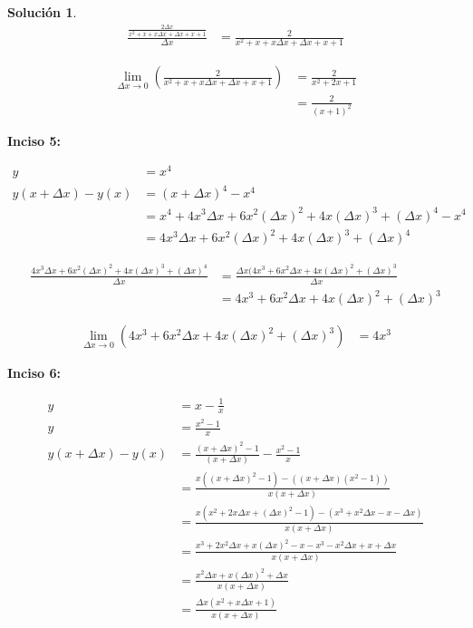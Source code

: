 \documentclass{article}
\theoremstyle{definition}
\newtheorem*{solution}{Solución}
\begin{document}
\begin{solution}
    \begin{align*}
        \frac{\frac{2\Delta x}{x^2+x+x\Delta x+\Delta x+x+1}}{\Delta x} &= \frac{2}{x^2+x+x\Delta x+\Delta x+x+1}
    \end{align*}

    \begin{align*}
        \lim_{\Delta x \to 0} (\frac{2}{x^2+x+x\Delta x+\Delta x+x+1}) &= \frac{2}{x^2+2x+1} \\
        &= \frac{2}{(x+1)^2}
    \end{align*}

\textbf{Inciso 5:}

    \begin{align*}
        y &= x^4 \\
        y(x+\Delta x) - y(x) &= (x+\Delta x)^4 - x^4\\
        &= x^4 + 4x^3 \Delta x + 6x^2 (\Delta x)^2 + 4x (\Delta x)^3 + (\Delta x)^4 - x^4 \\
        &= 4x^3 \Delta x + 6x^2 (\Delta x)^2 + 4x (\Delta x)^3 + (\Delta x)^4 
    \end{align*}

    \begin{align*}
        \frac{4x^3 \Delta x + 6x^2 (\Delta x)^2 + 4x (\Delta x)^3 + (\Delta x)^4 }{\Delta x} &= \frac{\Delta x(4x^3+6x^2\Delta x+4x(\Delta x)^2+(\Delta x)^3}{\Delta x} \\
        &= 4x^3+6x^2\Delta x+4x(\Delta x)^2+(\Delta x)^3
    \end{align*}

    \begin{align*}
        \lim_{\Delta x \to 0} (4x^3+6x^2\Delta x+4x(\Delta x)^2+(\Delta x)^3) &= 4x^3
    \end{align*}  

\textbf{Inciso 6:}

    \begin{align*}
        y &= x-\frac{1}{x} \\
        y &= \frac{x^2-1}{x} \\
        y(x+\Delta x) - y(x) &= \frac{(x+\Delta x)^2-1 }{(x+\Delta x)} - \frac{x^2-1}{x} \\
        &= \frac{x((x+\Delta x)^2-1)-((x+\Delta x)(x^2-1))}{x(x+\Delta x)} \\
        &= \frac{x(x^2+2x\Delta x+(\Delta x)^2-1)-(x^3+x^2\Delta x-x-\Delta x)}{x(x+\Delta x)} \\
        &= \frac{x^3+2x^2\Delta x+x(\Delta x)^2-x-x^3-x^2\Delta x+x+\Delta x}{x(x+\Delta x)} \\
        &= \frac{x^2\Delta x+x(\Delta x)^2+\Delta x}{x(x+\Delta x)} \\
        &= \frac{\Delta x(x^2+x\Delta x+1)}{x(x+\Delta x)}
    \end{align*}
    

\end{solution}
\end{document}
